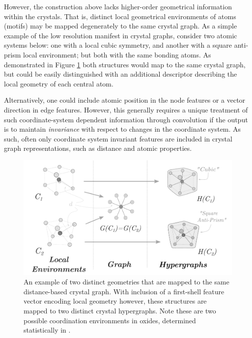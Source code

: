 \documentclass[10pt,a4paper,twocolumn]{article}
\begin{document}



However, the construction above lacks higher-order geometrical information within the crystals. That is, distinct local geometrical environments of atoms (motifs) may be mapped degenerately to the same crystal graph.
As a simple example of the low resolution manifest in crystal graphs, consider two atomic systems below: one with a local cubic symmetry, and another with a square anti-prism local environment; but both with the same bonding atoms. As demonstrated in Figure \ref{fig:graph_cntex} both structures would map to the same crystal graph, but could be easily distinguished with an additional descriptor describing the local geometry of each central atom.

Alternatively, one could include atomic position in the node features or a vector direction in edge features. However, this generally requires a unique treatment of such coordinate-system dependent information through convolution if the output is to maintain \textit{invariance} with respect to changes in the coordinate system. As such, often only coordinate system invariant features are included in crystal graph representations, such as distance and atomic properties. 

\begin{figure}
	\centering
	\includegraphics[scale=0.7]{graph2hgraph_tall_revise2.pdf}
	\caption{An example of two distinct geometries that are mapped to the same distance-based crystal graph. With inclusion of a first-shell feature vector encoding local geometry however, these structures are mapped to two distinct crystal hypergraphs. Note these are two possible coordination environments in oxides, determined statistically in \cite{motifstats}.}
	\label{fig:graph_cntex}
\end{figure}
\end{document}

